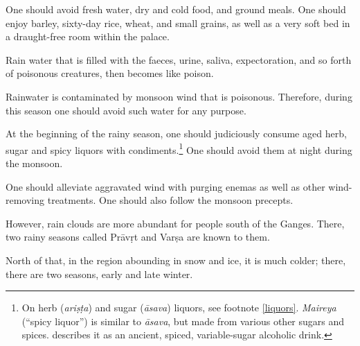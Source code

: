 \begin{translation}
\item[68]
One should avoid fresh water, %
dry and cold food, and ground meals.%
One should enjoy barley, sixty-day rice, %
wheat, and small grains, %
as well as a very soft bed in a draught-free room within the palace. 

\item[69]
Rain water %
that is filled with %
the faeces, urine, saliva, %
expectoration, %
and so forth of poisonous creatures, then becomes like poison. %

\item[70]
Rainwater is contaminated %
by monsoon wind %
that is poisonous. %
Therefore, %
during this season one should avoid such water for any purpose.

\item[71]
At the beginning of the rainy season, %
one should judiciously %
consume aged %
herb, sugar and spicy liquors
with condiments.\footnote{On herb (\emph{ariṣṭa}) and sugar (\emph{āsava}) liquors, see footnote \ref{liquors}. \emph{Maireya} (``spicy liquor'') is similar to \emph{āsava}, but made from various other sugars and spices. \citet[50--53]{mchu-2021} describes it as an ancient, spiced, variable-sugar alcoholic drink.} %
One should avoid them at night during the monsoon.

\item[72]
One should alleviate aggravated wind with purging %
enemas as well as other wind-removing treatments. One should also follow the monsoon precepts. 

\item[73]
However, rain %
clouds %
are more abundant %
for people south of the Ganges.
There, two rainy seasons called Prāvṛt and Varṣa are known to them. %

\item[74]
North of that, in the region %
abounding in snow and ice, %
it is much %
colder; 
there, there are two seasons, early %
and late winter.%


\end{translation}

